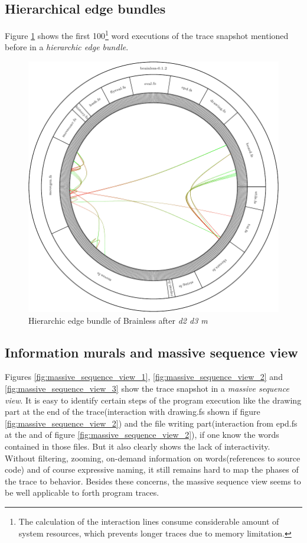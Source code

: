 \subsection*{Hierarchical edge bundles}

Figure \ref{fig:hierarchic_edge_bundle} shows the first 100\footnote{The calculation of the interaction lines consume considerable amount of system resources, which prevents longer traces due to memory limitation.} word executions of the trace snapshot mentioned before in a \emph{hierarchic edge bundle}.

\begin{figure}[p]
    \centering
    \includegraphics[scale=0.65]{graphics/hierarchic_edge_bundle-dir_file_word.png}
    \caption{Hierarchic edge bundle of Brainless after \emph{d2 d3 m}}
    \label{fig:hierarchic_edge_bundle}
\end{figure}


\subsection*{Information murals and massive sequence view}

Figures \ref{fig:massive_sequence_view_1}, \ref{fig:massive_sequence_view_2} and \ref{fig:massive_sequence_view_3} show the trace snapshot in a \emph{massive sequence view}. It is easy to identify certain steps of the program execution like the drawing part at the end of the trace(interaction with drawing.fs shown if figure \ref{fig:massive_sequence_view_2}) and the file writing part(interaction from epd.fs at the and of figure \ref{fig:massive_sequence_view_2}), if one know the words contained in those files. But it also clearly shows the lack of interactivity. Without filtering, zooming, on-demand information on words(references to source code) and of course expressive naming, it still remains hard to map the phases of the trace to behavior. Besides these concerns, the massive sequence view seems to be well applicable to forth program traces.

